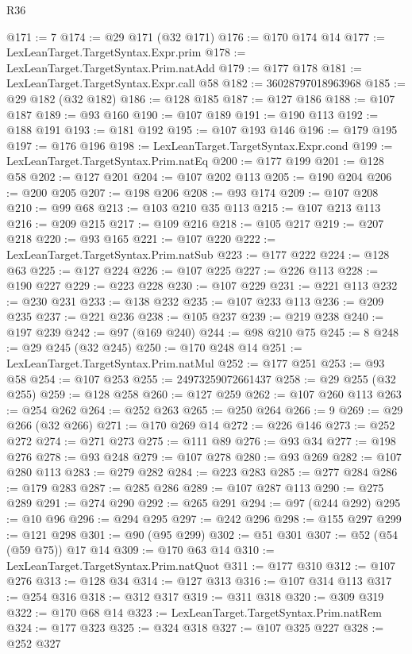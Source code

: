 \begin{lexlean}{R36}
\begin{coremodule}
@171 := 7
@174 := @29 @171 (@32 @171)
@176 := @170 @174 @14
@177 := LexLeanTarget.TargetSyntax.Expr.prim
@178 := LexLeanTarget.TargetSyntax.Prim.natAdd
@179 := @177 @178
@181 := LexLeanTarget.TargetSyntax.Expr.call @58
@182 := 36028797018963968
@185 := @29 @182 (@32 @182)
@186 := @128 @185
@187 := @127 @186
@188 := @107 @187
@189 := @93 @160
@190 := @107 @189
@191 := @190 @113
@192 := @188 @191
@193 := @181 @192
@195 := @107 @193 @146
@196 := @179 @195
@197 := @176 @196
@198 := LexLeanTarget.TargetSyntax.Expr.cond
@199 := LexLeanTarget.TargetSyntax.Prim.natEq
@200 := @177 @199
@201 := @128 @58
@202 := @127 @201
@204 := @107 @202 @113
@205 := @190 @204
@206 := @200 @205
@207 := @198 @206
@208 := @93 @174
@209 := @107 @208
@210 := @99 @68
@213 := @103 @210 @35 @113
@215 := @107 @213 @113
@216 := @209 @215
@217 := @109 @216
@218 := @105 @217
@219 := @207 @218
@220 := @93 @165
@221 := @107 @220
@222 := LexLeanTarget.TargetSyntax.Prim.natSub
@223 := @177 @222
@224 := @128 @63
@225 := @127 @224
@226 := @107 @225
@227 := @226 @113
@228 := @190 @227
@229 := @223 @228
@230 := @107 @229
@231 := @221 @113
@232 := @230 @231
@233 := @138 @232
@235 := @107 @233 @113
@236 := @209 @235
@237 := @221 @236
@238 := @105 @237
@239 := @219 @238
@240 := @197 @239
@242 := @97 (@169 @240)
@244 := @98 @210 @75
@245 := 8
@248 := @29 @245 (@32 @245)
@250 := @170 @248 @14
@251 := LexLeanTarget.TargetSyntax.Prim.natMul
@252 := @177 @251
@253 := @93 @58
@254 := @107 @253
@255 := 24973259072661437
@258 := @29 @255 (@32 @255)
@259 := @128 @258
@260 := @127 @259
@262 := @107 @260 @113
@263 := @254 @262
@264 := @252 @263
@265 := @250 @264
@266 := 9
@269 := @29 @266 (@32 @266)
@271 := @170 @269 @14
@272 := @226 @146
@273 := @252 @272
@274 := @271 @273
@275 := @111 @89
@276 := @93 @34
@277 := @198 @276
@278 := @93 @248
@279 := @107 @278
@280 := @93 @269
@282 := @107 @280 @113
@283 := @279 @282
@284 := @223 @283
@285 := @277 @284
@286 := @179 @283
@287 := @285 @286
@289 := @107 @287 @113
@290 := @275 @289
@291 := @274 @290
@292 := @265 @291
@294 := @97 (@244 @292)
@295 := @10 @96
@296 := @294 @295
@297 := @242 @296
@298 := @155 @297
@299 := @121 @298
@301 := @90 (@95 @299)
@302 := @51 @301
@307 := @52 (@54 (@59 @75)) @17 @14
@309 := @170 @63 @14
@310 := LexLeanTarget.TargetSyntax.Prim.natQuot
@311 := @177 @310
@312 := @107 @276
@313 := @128 @34
@314 := @127 @313
@316 := @107 @314 @113
@317 := @254 @316
@318 := @312 @317
@319 := @311 @318
@320 := @309 @319
@322 := @170 @68 @14
@323 := LexLeanTarget.TargetSyntax.Prim.natRem
@324 := @177 @323
@325 := @324 @318
@327 := @107 @325 @227
@328 := @252 @327

\end{coremodule}
\end{lexlean}
